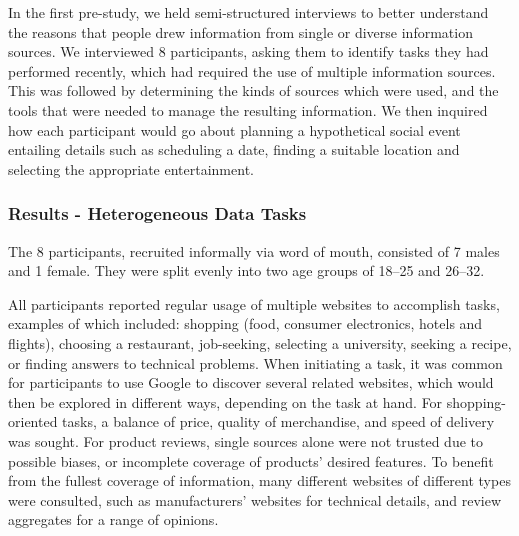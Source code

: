 \documentclass{sigchi}
\begin{document}
In the first pre-study, we held semi-structured interviews to better understand the reasons that people drew information from single or diverse information sources. We interviewed 8 participants, asking them to identify tasks they had performed recently, which had required the use of multiple information sources.  This was followed by determining the kinds of sources which were used, and the tools that were needed to manage the resulting information.  We then inquired how each participant would go about planning a hypothetical social event entailing details such as scheduling a  date, finding a suitable location and selecting the appropriate entertainment.

\subsubsection{Results - Heterogeneous Data Tasks}

The 8 participants, recruited informally via word of mouth, consisted of 7 males and 1 female. They were split evenly into two age groups of 18--25 and 26--32.   

All participants reported regular usage of multiple websites to accomplish tasks, examples of which included: shopping (food, consumer electronics, hotels and flights), choosing a restaurant, job-seeking, selecting a university, seeking a recipe, or finding answers to technical problems.  When initiating a task, it was common for participants to use Google to discover several related websites, which would then be explored in different ways, depending on the task at hand. For shopping-oriented tasks, a balance of price, quality of merchandise, and speed of delivery was sought.  For product reviews, single sources alone were not trusted due to possible biases, or incomplete coverage of products' desired features.  
To benefit from the fullest coverage of information, many different websites of different types were consulted, such as manufacturers' websites for technical details, and review aggregates for a range of opinions.
\end{document}
